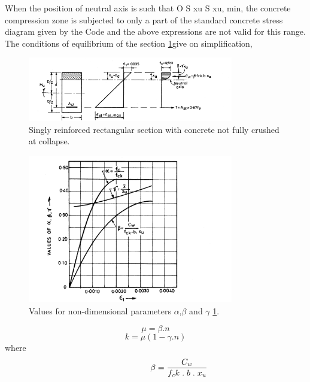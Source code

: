 When the position of neutral axis is such that O S xu S xu, min, the concrete compression
zone is subjected to only a part of the standard concrete stress diagram given by the Code and
the above expressions are not valid for this range. The conditions of equilibrium of the section
\fig \ref{Singly reinforced section}give on simpliﬁcation,
\begin{figure}
\centering
\includegraphics[width=0.8\textwidth]{images/ch2-2.png}
\caption{Singly reinforced rectangular section with concrete not fully crushed at collapse.}
\label{Singly reinforced section}
\end{figure}
\begin{figure}
\centering
\includegraphics[width=0.8\textwidth]{images/ch2-3.png}
\caption{Values for non-dimensional parameters ${\alpha}$,${\beta}$ and ${\gamma}$ \fig \ref{Singly reinforced section}.}
\label{Values for parameters}
\end{figure}
\newpage
\begin{equation}
\mu=\beta.n
\label{non-dimensional}
\end{equation}
\begin{equation}
k=\mu(1-\gamma.n)
\label{parameters}
\end{equation}
where
\begin{equation}
\hspace{2cm} \beta = \frac{C_w}{f_ck\hspace{0.1cm}.\hspace{0.1cm}b\hspace{0.1cm}.\hspace{0.1cm}x_u}
\label{Beta value}
\end{equation}
